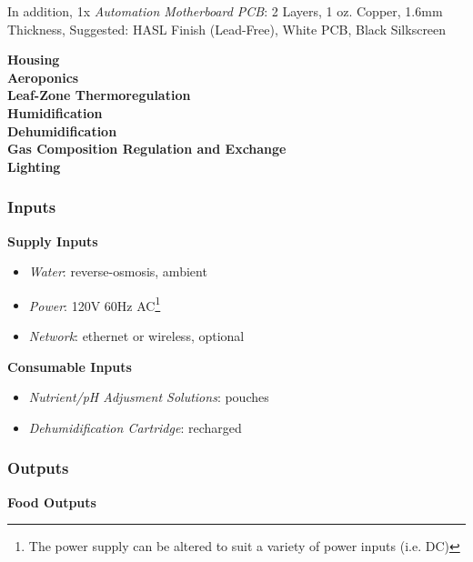 In addition, 1x \textit{Automation Motherboard PCB}: 2 Layers, 1 oz. Copper, 1.6mm Thickness, Suggested: HASL Finish (Lead-Free), White PCB, Black Silkscreen

\textbf{Housing}\\


\textbf{Aeroponics}\\


\textbf{Leaf-Zone Thermoregulation}\\


\textbf{Humidification}\\


\textbf{Dehumidification}\\


\textbf{Gas Composition Regulation and Exchange}\\


\textbf{Lighting}\\


\subsubsection{Inputs}

\textbf{Supply Inputs}
\begin{itemize}
    \item \textit{Water}: reverse-osmosis, ambient
    \item \textit{Power}: 120V 60Hz AC\footnote{The power supply can be altered to suit a variety of power inputs (i.e. DC)}
    \item \textit{Network}: ethernet or wireless, optional
\end{itemize}

\textbf{Consumable Inputs}
\begin{itemize}
    \item \textit{Nutrient/pH Adjusment Solutions}: pouches
    \item \textit{Dehumidification Cartridge}: recharged
\end{itemize}

\subsubsection{Outputs}

\textbf{Food Outputs}\\


